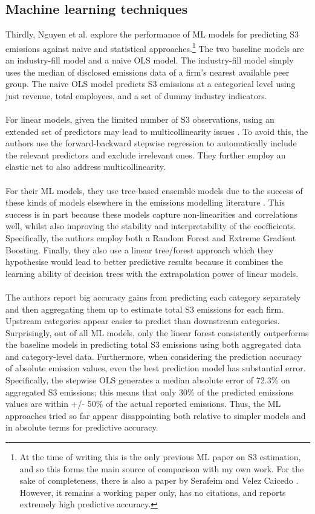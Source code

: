 \documentclass[12pt,twoside]{report}
\begin{document}
\subsection{Machine learning techniques}
Thirdly, Nguyen et al. \cite{Nguyenetal2023} explore the performance of ML models for predicting S3 emissions against naive and statistical approaches.\footnote{At the time of writing this is the only previous ML paper on S3 estimation, and so this forms the main source of comparison with my own work. For the sake of completeness, there is also a paper by Serafeim and Velez Caicedo \cite{Serafeim2022}. However, it remains a working paper only, has no citations, and reports extremely high predictive accuracy.} The two baseline models are an industry-fill model and a naive OLS model. The industry-fill model simply uses the median of disclosed emissions data of a firm's nearest available peer group. The naive OLS model predicts S3 emissions at a categorical level using just revenue, total employees, and a set of dummy industry indicators. 
\\\\
For linear models, given the limited number of S3 observations, using an extended set of predictors may lead to multicollinearity issues \cite{nguyen2021}. To avoid this, the authors use the forward-backward stepwise regression to automatically include the relevant predictors and exclude irrelevant ones. They further employ an elastic net to also address multicollinearity. 
\\\\
For their ML models, they use tree-based ensemble models due to the success of these kinds of models elsewhere in the emissions modelling literature \cite{nguyen2021, han2021}. This success is in part because these models capture non-linearities and correlations well, whilst also improving the stability and interpretability of the coefficients. Specifically, the authors employ both a Random Forest and Extreme Gradient Boosting. Finally, they also use a linear tree/forest approach which they hypothesise would lead to better predictive results because it combines the learning ability of decision trees with the extrapolation power of linear models. 
\\\\
The authors report big accuracy gains from predicting each category separately and then aggregating them up to estimate total S3 emissions for each firm. Upstream categories appear easier to predict than downstream categories. Surprisingly, out of all ML models, only the linear forest consistently outperforms the baseline models in predicting total S3 emissions using both aggregated data and category-level data. Furthermore, when considering the prediction accuracy of absolute emission values, even the best prediction model has substantial error. Specifically, the stepwise OLS generates a median absolute error of 72.3\% on aggregated S3 emissions; this means that only 30\% of the predicted emissions values are within +/- 50\% of the actual reported emissions. Thus, the ML approaches tried so far appear disappointing both relative to simpler models and in absolute terms for predictive accuracy.
\end{document}
